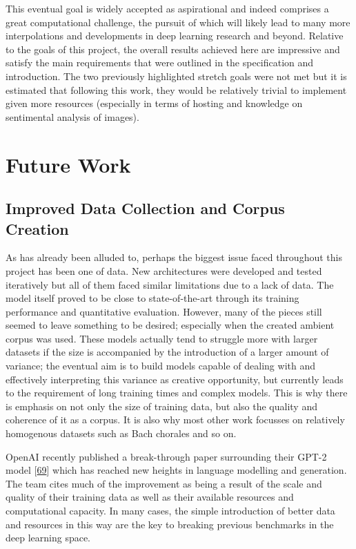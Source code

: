 \documentclass[12pt,]{article}
\begin{document}
This eventual goal is widely accepted as aspirational and indeed
comprises a great computational challenge, the pursuit of which will
likely lead to many more interpolations and developments in deep
learning research and beyond. Relative to the goals of this project, the
overall results achieved here are impressive and satisfy the main
requirements that were outlined in the specification and introduction.
The two previously highlighted stretch goals were not met but it is
estimated that following this work, they would be relatively trivial to
implement given more resources (especially in terms of hosting and
knowledge on sentimental analysis of images).

\hypertarget{future-work}{%
\section{Future Work}\label{future-work}}

\hypertarget{improved-data-collection-and-corpus-creation}{%
\subsection{Improved Data Collection and Corpus
Creation}\label{improved-data-collection-and-corpus-creation}}

As has already been alluded to, perhaps the biggest issue faced
throughout this project has been one of data. New architectures were
developed and tested iteratively but all of them faced similar
limitations due to a lack of data. The model itself proved to be close
to state-of-the-art through its training performance and quantitative
evaluation. However, many of the pieces still seemed to leave something
to be desired; especially when the created ambient corpus was used.
These models actually tend to struggle more with larger datasets if the
size is accompanied by the introduction of a larger amount of variance;
the eventual aim is to build models capable of dealing with and
effectively interpreting this variance as creative opportunity, but
currently leads to the requirement of long training times and complex
models. This is why there is emphasis on not only the size of training
data, but also the quality and coherence of it as a corpus. It is also
why most other work focusses on relatively homogenous datasets such as
Bach chorales and so on.

OpenAI recently published a break-through paper surrounding their GPT-2
model {[}\protect\hyperlink{ref-radford2018language}{69}{]} which has
reached new heights in language modelling and generation. The team cites
much of the improvement as being a result of the scale and quality of
their training data as well as their available resources and
computational capacity. In many cases, the simple introduction of better
data and resources in this way are the key to breaking previous
benchmarks in the deep learning space.
\end{document}
